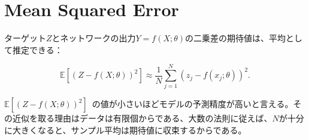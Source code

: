 \documentclass[dvipdfmx,a4paper]{jsarticle}%
\begin{document}
\maketitle
\vspace{-0.4cm}
\begin{figure}[H] 
  \centering
  \label{fig:my_label}
\end{figure}
\section{\textbf{Mean Squared Error}}
\thispagestyle{plain}
\begin{dfn}\label{def:cross-entropy}
ターゲット$Z$とネットワークの出力$Y = f(X; \theta)$の二乗差の期待値は、平均として推定できる：

$$\mathbb{E}[(Z - f(X; \theta))^2] \approx \frac{1}{N} \sum_{j=1}^{N} (z_j - f(x_j; \theta))^2.$$

\noindent
$\mathbb{E}[(Z - f(X; \theta))^2]$\ の値が小さいほどモデルの予測精度が高いと言える。その近似を取る理由はデータは有限個からである、大数の法則に従えば、$N$が十分に大きくなると、サンプル平均は期待値に収束するからである。

\end{dfn}
\end{document}
